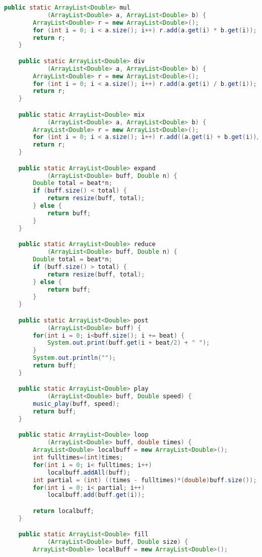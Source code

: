 \documentclass[a4paper]{article}
\begin{document}
\begin{lstlisting}[language=Java]
    public static ArrayList<Double> mul
            (ArrayList<Double> a, ArrayList<Double> b) {
        ArrayList<Double> r = new ArrayList<Double>();
        for (int i = 0; i < a.size(); i++) r.add(a.get(i) * b.get(i));
        return r;
    }

    public static ArrayList<Double> div
            (ArrayList<Double> a, ArrayList<Double> b) {
        ArrayList<Double> r = new ArrayList<Double>();
        for (int i = 0; i < a.size(); i++) r.add(a.get(i) / b.get(i));
        return r;
    }

    public static ArrayList<Double> mix
            (ArrayList<Double> a, ArrayList<Double> b) {
        ArrayList<Double> r = new ArrayList<Double>();
        for (int i = 0; i < a.size(); i++) r.add((a.get(i) + b.get(i))/2);
        return r;
    }

    public static ArrayList<Double> expand
            (ArrayList<Double> buff, Double n) {
        Double total = beat*n;
        if (buff.size() < total) {
            return resize(buff, total);
        } else {
            return buff;
        }
    }

    public static ArrayList<Double> reduce
            (ArrayList<Double> buff, Double n) {
        Double total = beat*n;
        if (buff.size() > total) {
            return resize(buff, total);
        } else {
            return buff;
        }
    }

    public static ArrayList<Double> post
            (ArrayList<Double> buff) {
        for(int i = 0; i<buff.size(); i += beat) {
            System.out.print(buff.get(i + beat/2) + " ");
        }
        System.out.println("");
        return buff;
    }

    public static ArrayList<Double> play
            (ArrayList<Double> buff, Double speed) {
        music_play(buff, speed);
        return buff;
    }

    public static ArrayList<Double> loop 
            (ArrayList<Double> buff, double times) {
        ArrayList<Double> localbuff = new ArrayList<Double>();
        int fulltimes=(int)times;
        for(int i = 0; i< fulltimes; i++)
            localbuff.addAll(buff);
        int partial = (int) ((times - fulltimes)*(double)buff.size());
        for(int i = 0; i< partial; i++)
            localbuff.add(buff.get(i));

        return localbuff;
    }

    public static ArrayList<Double> fill
            (ArrayList<Double> buff, Double size) {
        ArrayList<Double> localBuff = new ArrayList<Double>();


\end{lstlisting}
\end{document}
